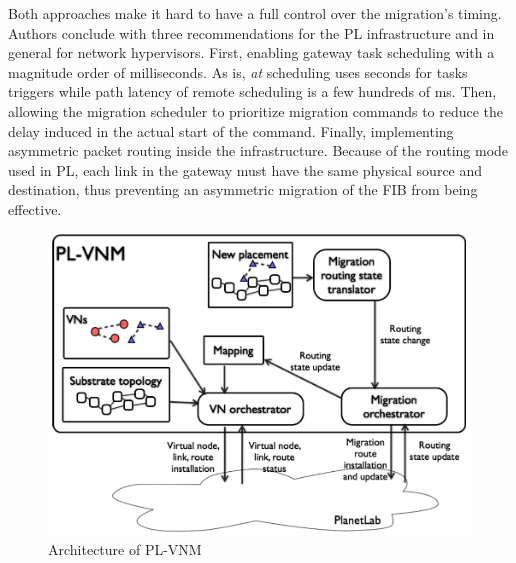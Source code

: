 Both approaches make it hard to have a full control over the migration's timing.
Authors conclude with three recommendations for the PL infrastructure and in general for network hypervisors.
First, enabling gateway task scheduling with a magnitude order of milliseconds. As is, \textit{at} scheduling uses seconds for tasks triggers while path latency of remote scheduling is a few hundreds of ms.
Then, allowing the migration scheduler to prioritize migration commands to reduce the delay induced in the actual start of the command.
Finally, implementing asymmetric packet routing inside the infrastructure.
Because of the routing mode used in PL, each link in the gateway must have the same physical source and destination, thus preventing an asymmetric migration of the FIB from being effective. 

\begin{figure}[ht]
    \centering
    \includegraphics[scale=0.5]{figures/pl-vnm.png}
    \caption{Architecture of PL-VNM~\cite{Lo2014}}
    \label{fig:plvnm}
\end{figure}

